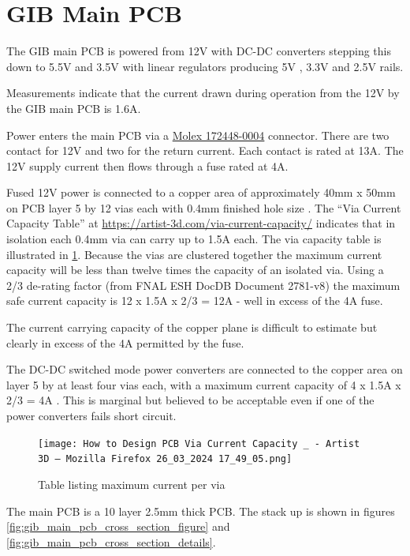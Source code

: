 \documentclass[fleqn,12pt,a4paper]{olplainarticle}
\begin{document}
\section{GIB Main PCB}

The GIB main PCB is powered from 12V with DC-DC converters stepping this down to 5.5V and 3.5V with linear regulators producing 5V , 3.3V and 2.5V rails.

Measurements indicate that the current drawn during operation from the 12V  by the GIB main PCB is 1.6A.

Power enters the main PCB via a \href{https://www.molex.com/en-us/products/part-detail/1724480004}{Molex 172448-0004} connector. There are two contact for 12V and two for the return current. Each contact is rated at 13A. The 12V supply current then flows through a fuse rated at 4A.

Fused 12V power is connected to a copper area of approximately 40mm x 50mm on PCB layer 5 by 12 vias each with 0.4mm finished hole size . The ``Via Current Capacity Table'' at \url{https://artist-3d.com/via-current-capacity/} indicates that in isolation each 0.4mm via can carry up to 1.5A each. The via capacity table is illustrated in \ref{fig:via-current-table}. Because the vias are clustered together the maximum current capacity will be less than twelve times the capacity of an isolated via. Using a 2/3 de-rating factor (from FNAL ESH DocDB Document 2781-v8\cite{ref:fnal-esh-design-standards}) the maximum safe current capacity is 12 x 1.5A x 2/3 = 12A - well in excess of the 4A fuse.

The current carrying capacity of the copper plane  is difficult to estimate but clearly in excess of the 4A permitted by the fuse.

The DC-DC switched mode power converters are connected to the copper area on layer 5 by at least four vias each, with a maximum current capacity of 
4 x 1.5A x 2/3 = 4A . This is marginal but believed to be acceptable even if one of the power converters fails short circuit.

\begin{figure}
    \centering
    \texttt{[image: How to Design PCB Via Current Capacity \_ - Artist 3D — Mozilla Firefox 26\_03\_2024 17\_49\_05.png]}
    \caption{Table listing maximum current per via}
    \label{fig:via-current-table}
\end{figure}

The main PCB is a 10 layer 2.5mm thick PCB. The stack up is shown in figures \ref{fig:gib_main_pcb_cross_section_figure} and \ref{fig:gib_main_pcb_cross_section_details}.
\end{document}

